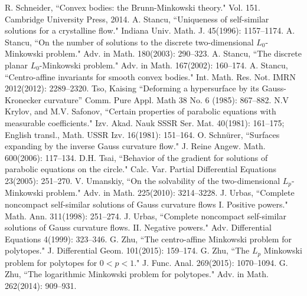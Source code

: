 \documentclass{amsart}
\theoremstyle{definition}
\theoremstyle{remark}
\numberwithin{equation}{section}
\begin{document}
\begin{thebibliography}{10}
 R. Schneider, ``Convex bodies: the Brunn-Minkowski theory." Vol. 151. Cambridge University Press, 2014.
A. Stancu, ``Uniqueness of self-similar solutions for a crystalline flow." Indiana Univ. Math. J. 45(1996): 1157--1174.
A. Stancu, ``On the number of solutions to the discrete two-dimensional $L_0$-Minkowski problem." Adv. in Math. 180(2003): 290--323.
 A. Stancu, ``The discrete planar $L_0$-Minkowski problem." Adv. in Math. 167(2002): 160--174.
 A. Stancu, ``Centro-affine invariants for smooth convex bodies."  Int. Math. Res. Not. IMRN 2012(2012): 2289--2320.
 Tso, Kaising ``Deforming a hypersurface by its {G}auss-{K}ronecker curvature'' Comm. Pure Appl. Math 38 No. 6 (1985): 867--882.
 N.V Krylov, and M.V. Safonov, ``Certain properties of parabolic equations with measurable coefficients." Izv. Akad. Nauk SSSR Ser. Mat. 40(1981): 161--175; English transl., Math. USSR Izv. 16(1981): 151--164.
 O. Schn\"{u}rer, ``Surfaces expanding by the inverse Gauss curvature flow."  J. Reine Angew. Math. 600(2006): 117--134.
 D.H. Tsai, ``Behavior of the gradient for solutions of parabolic equations on the circle." Calc. Var. Partial Differential Equations 23(2005): 251--270.
 V. Umanskiy, ``On the solvability of the two-dimensional $L_p$-Minkowski problem." Adv. in Math. 225(2010): 3214--3228.
 J. Urbas, ``Complete noncompact self-similar solutions of Gauss curvature flows I. Positive powers." Math. Ann. 311(1998): 251--274.
 J. Urbas, ``Complete noncompact self-similar solutions of Gauss curvature flows. II. Negative powers." Adv. Differential Equations 4(1999): 323--346.
  G. Zhu, ``The centro-affine Minkowski problem for polytopes." J. Differential Geom. 101(2015): 159--174.
 G. Zhu, ``The $L_p$ Minkowski problem for polytopes for $0<p<1$." J. Func. Anal. 269(2015): 1070--1094.
 G. Zhu, ``The logarithmic Minkowski problem for polytopes." Adv. in Math. 262(2014): 909--931.

\end{thebibliography}
\end{document}
